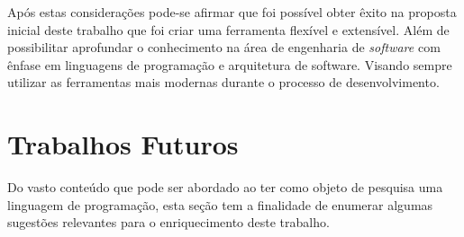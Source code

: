 Após estas considerações pode-se afirmar que foi possível obter êxito na proposta inicial deste trabalho que foi criar uma ferramenta flexível e extensível. Além de possibilitar aprofundar o conhecimento na área de engenharia de \textit{software} com ênfase em linguagens de programação e arquitetura de software. Visando sempre utilizar as ferramentas mais modernas durante o processo de desenvolvimento.





\section{Trabalhos Futuros}
Do vasto conteúdo que pode ser abordado ao ter como objeto de pesquisa uma linguagem de programação, esta seção tem a finalidade de enumerar algumas sugestões relevantes para o enriquecimento deste trabalho.

